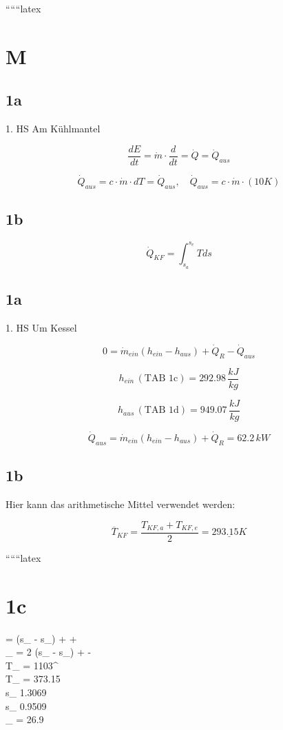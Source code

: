 
``````latex


\section*{M}

\subsection*{1a}
1. HS Am Kühlmantel

\[
\frac{dE}{dt} = \dot{m} \cdot \frac{d}{dt} = \dot{Q} = \dot{Q}_{aus}
\]

\[
\dot{Q}_{aus} = c \cdot \dot{m} \cdot dT = \dot{Q}_{aus}, \quad \dot{Q}_{aus} = c \cdot \dot{m} \cdot (10K)
\]

\subsection*{1b}
\[
\dot{Q}_{KF} = \int_{s_a}^{s_e} T ds
\]

\subsection*{1a}
1. HS Um Kessel

\[
0 = \dot{m}_{ein}(h_{ein} - h_{aus}) + \dot{Q}_R - \dot{Q}_{aus}
\]

\[
h_{ein} \, (\text{TAB 1c}) = 292.98 \, \frac{kJ}{kg}
\]

\[
h_{aus} \, (\text{TAB 1d}) = 949.07 \, \frac{kJ}{kg}
\]

\[
\dot{Q}_{aus} = \dot{m}_{ein}(h_{ein} - h_{aus}) + \dot{Q}_R = 62.2 \, kW
\]

\subsection*{1b}
Hier kann das arithmetische Mittel verwendet werden:

\[
\overline{T}_{KF} = \frac{T_{KF,a} + T_{KF,e}}{2} = \underline{293.15K}
\]

``````latex


\section*{1c}
  =  (s_{} - s_{}) +  +  \\
_{} = 2  (s_{} - s_{}) +  -  \\
T_{} = 1103^\circ {} \\
T_{} = 373.15  \\
s_{} \Rightarrow {} 1.3069  \\
s_{} \Rightarrow {} 0.9509  \\
_{} = 26.9  \\
\rightarrow

